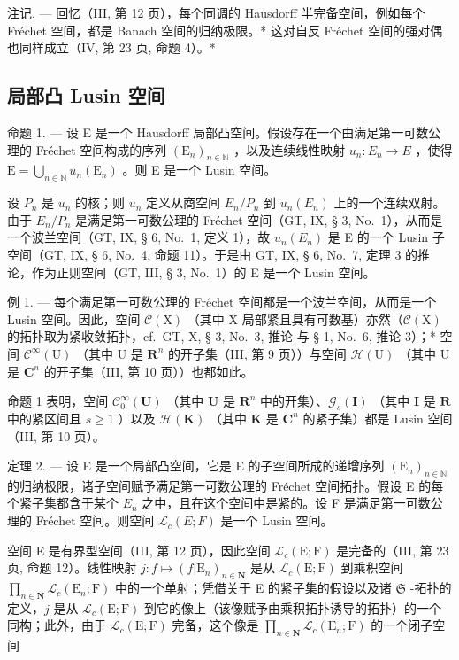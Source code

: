 注记. --- 回忆（III, 第 12 页），每个同调的 Hausdorff 半完备空间，例如每个 Fréchet 空间，都是 Banach 空间的归纳极限。* 这对自反 Fréchet 空间的强对偶也同样成立（IV, 第 23 页, 命题 4）。*

\subsection{局部凸 Lusin 空间}

命题 1. --- 设 E 是一个 Hausdorff 局部凸空间。假设存在一个由满足第一可数公理的 Fréchet 空间构成的序列 \((\mathrm{E}_{n})_{n\in\mathbb{N}}\) ，以及连续线性映射 \(u_{n}:E_{n}\to E\) ，使得 \(\mathrm{E}=\bigcup_{n\in\mathbb{N}}u_{n}(\mathrm{E}_{n})\) 。则 E 是一个 Lusin 空间。

设 \(P_n\) 是 \(u_n\) 的核；则 \(u_n\) 定义从商空间 \(E_n / P_n\) 到 \(u_n(E_n)\) 上的一个连续双射。由于 \(E_n / P_n\) 是满足第一可数公理的 Fréchet 空间（GT, IX, § 3, No.~1），从而是一个波兰空间（GT, IX, § 6, No.~1, 定义 1），故 \(u_n(E_n)\) 是 E 的一个 Lusin 子空间（GT, IX, § 6, No.~4, 命题 11）。于是由 GT, IX, § 6, No.~7, 定理 3 的推论，作为正则空间（GT, III, § 3, No.~1）的 E 是一个 Lusin 空间。

例 1. --- 每个满足第一可数公理的 Fréchet 空间都是一个波兰空间，从而是一个 Lusin 空间。因此，空间 \(\mathcal{C}(\mathrm{X})\) （其中 \(\mathrm{X}\) 局部紧且具有可数基）亦然（\(\mathcal{C}(\mathrm{X})\) 的拓扑取为紧收敛拓扑，cf.~GT, X, § 3, No.~3, 推论 与 § 1, No.~6, 推论 3）；* 空间 \(\mathcal{C}^{\infty}(\mathrm{U})\) （其中 U 是 \(\mathbf{R}^{n}\) 的开子集（III, 第 9 页））与空间 \(\mathcal{H}(\mathrm{U})\) （其中 U 是 \(\mathbf{C}^{n}\) 的开子集（III, 第 10 页））也都如此。

命题 1 表明，空间 \(\mathcal{C}_0^\infty (\mathbf{U})\) （其中 \(\mathbf{U}\) 是 \(\mathbf{R}^n\) 中的开集）、\(\mathcal{G}_s(\mathbf{I})\) （其中 \(\mathbf{I}\) 是 \(\mathbf{R}\) 中的紧区间且 \(s\geqslant 1\) ）以及 \(\mathcal{H}(\mathbf{K})\) （其中 \(\mathbf{K}\) 是 \(\mathbf{C}^n\) 的紧子集）都是 Lusin 空间（III, 第 10 页）。

定理 2. --- 设 E 是一个局部凸空间，它是 E 的子空间所成的递增序列 \((\mathrm{E}_n)_{n\in \mathbb{N}}\) 的归纳极限，诸子空间赋予满足第一可数公理的 Fréchet 空间拓扑。假设 E 的每个紧子集都含于某个 \(E_{n}\) 之中，且在这个空间中是紧的。设 F 是满足第一可数公理的 Fréchet 空间。则空间 \(\mathcal{L}_{c}(E;F)\) 是一个 Lusin 空间。

空间 E 是有界型空间（III, 第 12 页），因此空间 \(\mathcal{L}_c(\mathrm{E};\mathrm{F})\) 是完备的（III, 第 23 页, 命题 12）。线性映射 \(j\colon f\mapsto (f|\mathrm{E}_n)_{n\in \mathbf{N}}\) 是从 \(\mathcal{L}_c(\mathrm{E};\mathrm{F})\) 到乘积空间 \(\prod_{n\in \mathbf{N}}\mathcal{L}_c(\mathrm{E}_n;\mathrm{F})\) 中的一个单射；凭借关于 E 的紧子集的假设以及诸 \(\mathfrak{S}\) -拓扑的定义，\(j\) 是从 \(\mathcal{L}_c(\mathrm{E};\mathrm{F})\) 到它的像上（该像赋予由乘积拓扑诱导的拓扑）的一个同构；此外，由于 \(\mathcal{L}_c(\mathrm{E};\mathrm{F})\) 完备，这个像是 \(\prod_{n\in \mathbf{N}}\mathcal{L}_c(\mathrm{E}_n;\mathrm{F})\) 的一个闭子空间

